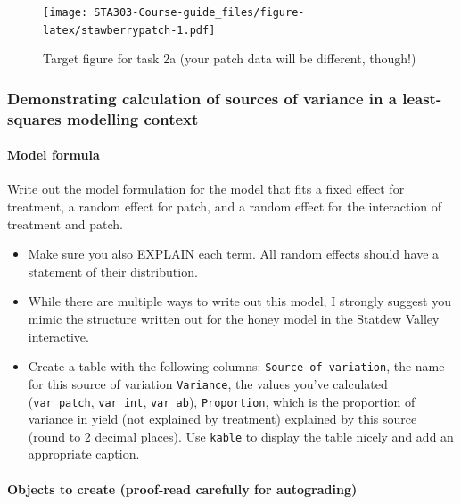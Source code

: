 \documentclass[
  openany]{book}
\begin{document}
\begin{figure}
\centering
\texttt{[image: STA303-Course-guide\_files/figure-latex/stawberrypatch-1.pdf]}
\caption{\label{fig:stawberrypatch}Target figure for task 2a (your patch data will be different, though!)}
\end{figure}

\hypertarget{demonstrating-calculation-of-sources-of-variance-in-a-least-squares-modelling-context}{%
\subsubsection{Demonstrating calculation of sources of variance in a least-squares modelling context}\label{demonstrating-calculation-of-sources-of-variance-in-a-least-squares-modelling-context}}

\hypertarget{model-formula}{%
\paragraph{Model formula}\label{model-formula}}

Write out the model formulation for the model that fits a fixed effect for treatment, a random effect for patch, and a random effect for the interaction of treatment and patch.

\begin{itemize}
\item
  Make sure you also EXPLAIN each term. All random effects should have a statement of their distribution.
\item
  While there are multiple ways to write out this model, I strongly suggest you mimic the structure written out for the honey model in the Statdew Valley interactive.
\item
  Create a table with the following columns: \texttt{Source\ of\ variation}, the name for this source of variation \texttt{Variance}, the values you've calculated (\texttt{var\_patch}, \texttt{var\_int}, \texttt{var\_ab}), \texttt{Proportion}, which is the proportion of variance in yield (not explained by treatment) explained by this source (round to 2 decimal places). Use \texttt{kable} to display the table nicely and add an appropriate caption.
\end{itemize}

\hypertarget{objects-to-create-proof-read-carefully-for-autograding}{%
\paragraph{Objects to create (proof-read carefully for autograding)}\label{objects-to-create-proof-read-carefully-for-autograding}}
\end{document}
